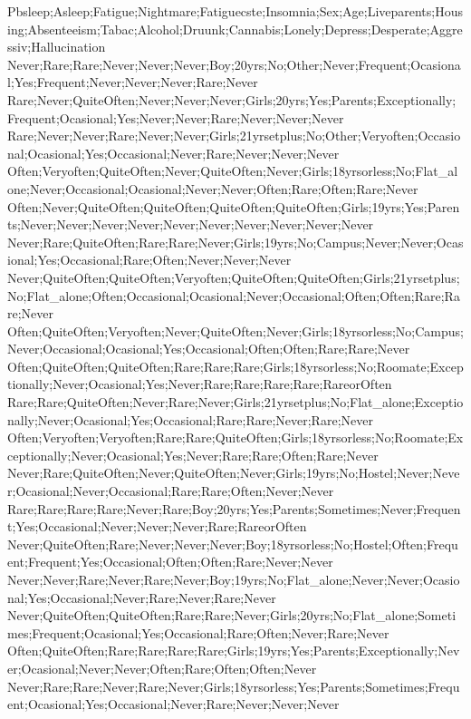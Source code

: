 Pbsleep;Asleep;Fatigue;Nightmare;Fatiguecste;Insomnia;Sex;Age;Liveparents;Housing;Absenteeism;Tabac;Alcohol;Druunk;Cannabis;Lonely;Depress;Desperate;Aggressiv;Hallucination
Never;Rare;Rare;Never;Never;Never;Boy;20yrs;No;Other;Never;Frequent;Ocasional;Yes;Frequent;Never;Never;Never;Rare;Never
Rare;Never;QuiteOften;Never;Never;Never;Girls;20yrs;Yes;Parents;Exceptionally;Frequent;Ocasional;Yes;Never;Never;Rare;Never;Never;Never
Rare;Never;Never;Rare;Never;Never;Girls;21yrsetplus;No;Other;Veryoften;Occasional;Ocasional;Yes;Occasional;Never;Rare;Never;Never;Never
Often;Veryoften;QuiteOften;Never;QuiteOften;Never;Girls;18yrsorless;No;Flat_alone;Never;Occasional;Ocasional;Never;Never;Often;Rare;Often;Rare;Never
Often;Never;QuiteOften;QuiteOften;QuiteOften;QuiteOften;Girls;19yrs;Yes;Parents;Never;Never;Never;Never;Never;Never;Never;Never;Never;Never
Never;Rare;QuiteOften;Rare;Rare;Never;Girls;19yrs;No;Campus;Never;Never;Ocasional;Yes;Occasional;Rare;Often;Never;Never;Never
Never;QuiteOften;QuiteOften;Veryoften;QuiteOften;QuiteOften;Girls;21yrsetplus;No;Flat_alone;Often;Occasional;Ocasional;Never;Occasional;Often;Often;Rare;Rare;Never
Often;QuiteOften;Veryoften;Never;QuiteOften;Never;Girls;18yrsorless;No;Campus;Never;Occasional;Ocasional;Yes;Occasional;Often;Often;Rare;Rare;Never
Often;QuiteOften;QuiteOften;Rare;Rare;Rare;Girls;18yrsorless;No;Roomate;Exceptionally;Never;Ocasional;Yes;Never;Rare;Rare;Rare;Rare;RareorOften
Rare;Rare;QuiteOften;Never;Rare;Never;Girls;21yrsetplus;No;Flat_alone;Exceptionally;Never;Ocasional;Yes;Occasional;Rare;Rare;Never;Rare;Never
Often;Veryoften;Veryoften;Rare;Rare;QuiteOften;Girls;18yrsorless;No;Roomate;Exceptionally;Never;Ocasional;Yes;Never;Rare;Rare;Often;Rare;Never
Never;Rare;QuiteOften;Never;QuiteOften;Never;Girls;19yrs;No;Hostel;Never;Never;Ocasional;Never;Occasional;Rare;Rare;Often;Never;Never
Rare;Rare;Rare;Rare;Never;Rare;Boy;20yrs;Yes;Parents;Sometimes;Never;Frequent;Yes;Occasional;Never;Never;Never;Rare;RareorOften
Never;QuiteOften;Rare;Never;Never;Never;Boy;18yrsorless;No;Hostel;Often;Frequent;Frequent;Yes;Occasional;Often;Often;Rare;Never;Never
Never;Never;Rare;Never;Rare;Never;Boy;19yrs;No;Flat_alone;Never;Never;Ocasional;Yes;Occasional;Never;Rare;Never;Rare;Never
Never;QuiteOften;QuiteOften;Rare;Rare;Never;Girls;20yrs;No;Flat_alone;Sometimes;Frequent;Ocasional;Yes;Occasional;Rare;Often;Never;Rare;Never
Often;QuiteOften;Rare;Rare;Rare;Rare;Girls;19yrs;Yes;Parents;Exceptionally;Never;Ocasional;Never;Never;Often;Rare;Often;Often;Never
Never;Rare;Rare;Never;Rare;Never;Girls;18yrsorless;Yes;Parents;Sometimes;Frequent;Ocasional;Yes;Occasional;Never;Rare;Never;Never;Never
